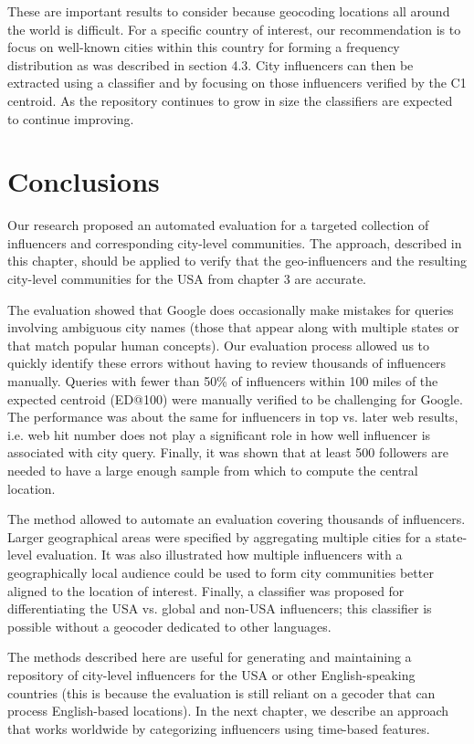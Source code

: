 These are important results to consider because geocoding locations all around the world is difficult. For a specific country of interest, our recommendation is to focus on well-known cities within this country for forming a frequency distribution as was described in section 4.3. City influencers can then be extracted using a classifier and by focusing on those influencers verified by the C1 centroid. As the repository continues to grow in size the classifiers are expected to continue improving.

\section{Conclusions}
Our research proposed an automated evaluation for a targeted collection of influencers and corresponding city-level communities. The approach, described in this chapter, should be applied to verify that the geo-influencers and the resulting city-level communities for the USA from chapter 3 are accurate. 

The evaluation showed that Google does occasionally make mistakes for queries involving ambiguous city names (those that appear along with multiple states or that match popular human concepts). Our evaluation process allowed us to quickly identify these errors without having to review thousands of influencers manually. Queries with fewer than 50\% of influencers within 100 miles of the expected centroid (ED@100) were manually verified to be challenging for Google. The performance was about the same for influencers in top vs. later web results, i.e. web hit number does not play a significant role in how well influencer is associated with city query. Finally, it was shown that at least 500 followers are needed to have a large enough sample from which to compute the central location.

The method allowed to automate an evaluation covering thousands of influencers. Larger geographical areas were specified by aggregating multiple cities for a state-level evaluation. It was also illustrated how multiple influencers with a geographically local audience could be used to form city communities better aligned to the location of interest. Finally, a classifier was proposed for differentiating the USA vs. global and non-USA influencers; this classifier is possible without a geocoder dedicated to other languages. 

The methods described here are useful for generating and maintaining a repository of city-level influencers for the USA or other English-speaking countries (this is because the evaluation is still reliant on a gecoder that can process English-based locations). In the next chapter, we describe an approach that works worldwide by categorizing influencers using time-based features.

